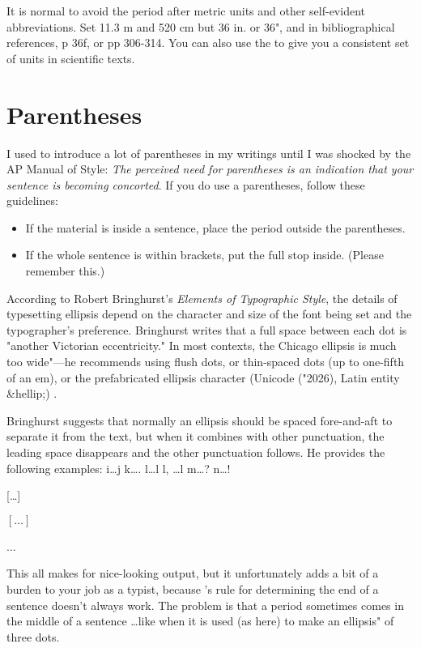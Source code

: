 It is normal to avoid the period after metric units and other self-evident abbreviations. Set 11.3 m and 520 cm but 36 in. or 36", and in bibliographical references, p 36f, or pp 306-314. You can also use the  to give you a consistent set of units in scientific texts.

\section{Parentheses}

I used to introduce a lot of parentheses in my writings until I was shocked by the AP Manual of Style:
\emph{The perceived need for parentheses is an indication that your sentence is becoming concorted}. If you do use a parentheses, follow these guidelines:

\begin{itemize}
\item If the material is inside a sentence, place the period outside the parentheses.
\item If the whole sentence is within brackets, put the full stop inside. (Please remember this.)
\end{itemize}

According to Robert Bringhurst's  \textit{Elements of Typographic Style}, the details of typesetting ellipsis depend on the character and size of the font being set and the typographer's preference. Bringhurst writes that a full space between each dot is "another Victorian eccentricity." In most contexts, the Chicago ellipsis is much too wide"—he recommends using flush dots, or thin-spaced dots (up to one-fifth of an em), or the prefabricated ellipsis character (Unicode  ({\pan \char"2026}), Latin entity \&hellip;) \citep{Bringhurst2005}.

Bringhurst suggests that normally an ellipsis should be spaced fore-and-aft to separate it from the text, but when it combines with other punctuation, the leading space disappears and the other punctuation follows. He provides the following examples:
i\ldots j	k\ldots.	l\ldots l	l, \ldots l	m\ldots?	n\ldots!

[\dots]\lorem

$[\ldots]$\lorem

...\lorem



This all makes for nice-looking output, but it unfortunately adds a bit
of a burden to your job as a typist, because \tex's rule for determining the end of
a sentence doesn't always work. The problem is that a period sometimes comes
in the middle of a sentence \dots like when it is used (as here) to make an ellipsis" of three dots.


